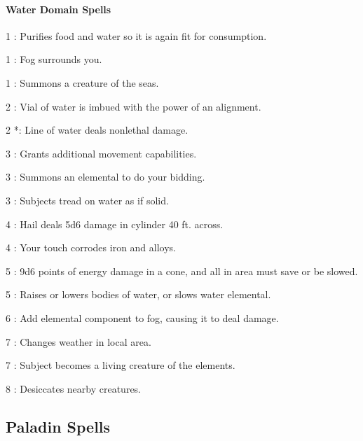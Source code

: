 \paragraph{Water Domain Spells}
\begin{list}{}{\leftmargin=1em}
\item[1] : Purifies food and water so it is again fit for consumption.
\item[1] : Fog surrounds you.
\item[1] : Summons a creature of the seas.
\item[2] : Vial of water is imbued with the power of an alignment.
\item[2] *: Line of water deals nonlethal damage.
\item[3] : Grants additional movement capabilities.
\item[3] : Summons an elemental to do your bidding.
\item[3] : Subjects tread on water as if solid.
\item[4] : Hail deals 5d6 damage in cylinder 40 ft. across.
\item[4] : Your touch corrodes iron and alloys.
\item[5] : 9d6 points of energy damage in a cone, and all in area must save or be slowed.
\item[5] : Raises or lowers bodies of water, or slows water elemental.
\item[6] : Add elemental component to fog, causing it to deal damage.
\item[7] : Changes weather in local area.
\item[7] : Subject becomes a living creature of the elements.
\item[8] : Desiccates nearby creatures.
\end{list}
\subsection{Paladin Spells}
